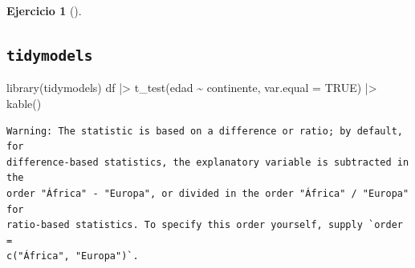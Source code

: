 \documentclass[
  a4paper,
]{scrreport}
\newenvironment{Shaded}{\begin{snugshade}}{\end{snugshade}}
\newcommand{\AttributeTok}[1]{\textcolor[rgb]{0.40,0.45,0.13}{#1}}
\newcommand{\ConstantTok}[1]{\textcolor[rgb]{0.56,0.35,0.01}{#1}}
\newcommand{\FunctionTok}[1]{\textcolor[rgb]{0.28,0.35,0.67}{#1}}
\newcommand{\NormalTok}[1]{\textcolor[rgb]{0.00,0.23,0.31}{#1}}
\newcommand{\SpecialCharTok}[1]{\textcolor[rgb]{0.37,0.37,0.37}{#1}}
\theoremstyle{definition}
\newtheorem{exercise}{Ejercicio}[chapter]
\theoremstyle{remark}
\begin{document}
\begin{exercise}[]
\begin{enumerate}
\begin{tcolorbox}
  \section{\texorpdfstring{\texttt{tidymodels}}{tidymodels}}

\begin{Shaded}
\begin{Highlighting}[]
\FunctionTok{library}\NormalTok{(tidymodels)}
\NormalTok{df }\SpecialCharTok{|\textgreater{}} 
    \FunctionTok{t\_test}\NormalTok{(edad }\SpecialCharTok{\textasciitilde{}}\NormalTok{ continente, }\AttributeTok{var.equal =} \ConstantTok{TRUE}\NormalTok{) }\SpecialCharTok{|\textgreater{}} 
    \FunctionTok{kable}\NormalTok{() }
\end{Highlighting}
\end{Shaded}

\begin{verbatim}
Warning: The statistic is based on a difference or ratio; by default, for
difference-based statistics, the explanatory variable is subtracted in the
order "África" - "Europa", or divided in the order "África" / "Europa" for
ratio-based statistics. To specify this order yourself, supply `order =
c("África", "Europa")`.
\end{verbatim}


\end{tcolorbox}
\end{enumerate}
\end{exercise}
\end{document}
